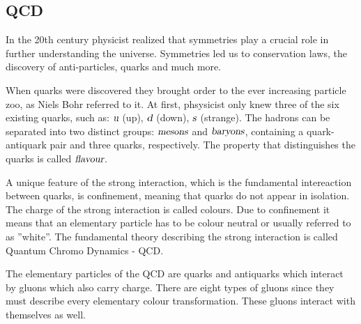 \documentclass[a4paper,12pt]{article}
\begin{document}
\subsection{QCD}
\vspace{5mm}
\par In the 20th century physicist realized that symmetries play a crucial role in further understanding the universe. Symmetries led us to conservation laws, the discovery of anti-particles, quarks and much more. 
\vspace{5mm}
\par When quarks were discovered they brought order to the ever increasing particle zoo, as Niels Bohr referred to it. At first, phsysicist only knew three of the six existing quarks, such as: $\textsl{u}$ (up), $\textsl{d}$ (down), $\textsl{s}$ (strange). The hadrons can be separated into two distinct groups: $\textsl{mesons}$ and $\textsl{baryons}$, containing a quark-antiquark pair and three quarks, respectively. The property that distinguishes the quarks is called $\textsl{flavour}$.
\vspace{5mm}
\par A unique feature of the strong interaction, which is the fundamental intereaction between quarks, is confinement, meaning that quarks do not appear in isolation. The charge of the strong interaction is called colours. Due to confinement it means that an elementary particle has to be colour neutral or usually referred to as ''white''. The fundamental theory describing the strong interaction is called Quantum Chromo Dynamics - QCD.
\vspace{5mm}
\par The elementary particles of the QCD are quarks and antiquarks which interact by gluons which also carry charge. There are eight types of gluons since they must describe every elementary colour transformation. These gluons interact with themselves as well.
\end{document}
